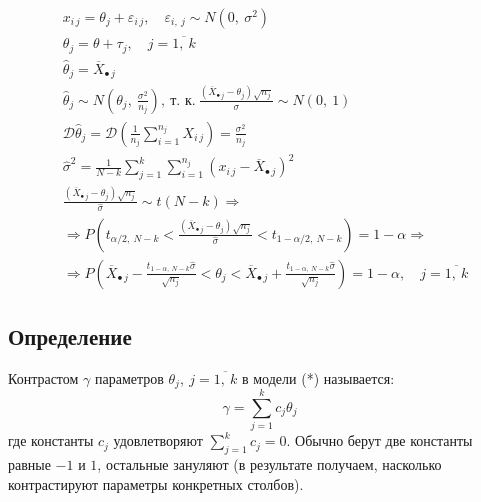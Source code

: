 \documentclass[12pt, a4paper]{article}
\newcommand{\dev}{\mathcal{D}}
\begin{document}
\begin{equation*}
    \begin{aligned}
        &x_{i\, j} = \theta_j + \varepsilon_{i\, j},\quad \varepsilon_{i,\ j} \sim N(0,\ \sigma^2)\\
        &\theta_{j} = \theta + \tau_j,\quad j = \overline{1,\ k}\\
        &\hat \theta_j = \overline{X}_{\bullet\, j}\\
        &\hat \theta_j \sim N\left(\theta_j,\ \frac{\sigma^2}{n_j}\right),\ \text{т. к.}\ \frac{(\overline{X}_{\bullet\, j} -\theta_j) \sqrt{n_j}}{\sigma} \sim N(0,\ 1)\\
        &\dev \hat \theta_j = \dev\left( \frac{1}{n_j} \sum_{i = 1}^{n_j} X_{i\, j} \right) = \frac{\sigma^2}{n_j}\\
        &\hat \sigma^2 = \frac{1}{N - k} \sum_{j = 1}^{k} \sum_{i = 1}^{n_j} {\left( x_{i\, j} - \overline{X}_{\bullet\, j}\right)}^2\\
        &\frac{\left( \overline{X}_{\bullet\, j} - \theta_j \right) \sqrt{n_j}}{\hat \sigma} \sim t(N - k) \Rightarrow\\
        &\Rightarrow P\left( t_{\alpha/2,\ N - k} < \frac{\left( \overline{X}_{\bullet\, j} - \theta_j \right) \sqrt{n_j}}{\hat \sigma} < t_{1 - \alpha/2,\ N - k} \right) = 1 - \alpha \Rightarrow\\
        &\Rightarrow P\left( \overline{X}_{\bullet\, j} - \frac{t_{1 - \alpha,\ N - k} \hat\sigma}{\sqrt{n_j}} < \theta_j < \overline{X}_{\bullet\, j} + \frac{t_{1 - \alpha,\ N - k} \hat\sigma}{\sqrt{n_j}} \right) = 1 - \alpha,\quad j = \overline{1,\ k}
    \end{aligned}
\end{equation*}
\subsection*{Определение}
Контрастом $\gamma$ параметров $\theta_j,\ j = \overline{1,\ k}$ в модели (*) называется:
\[\gamma = \sum_{j = 1}^{k} c_j \theta_j\]
где константы $c_j$ удовлетворяют $\displaystyle \sum_{j = 1}^{k} c_j = 0$. Обычно берут две константы равные $-1$ и $1$, остальные зануляют (в результате получаем, насколько контрастируют параметры конкретных столбов).
\end{document}
